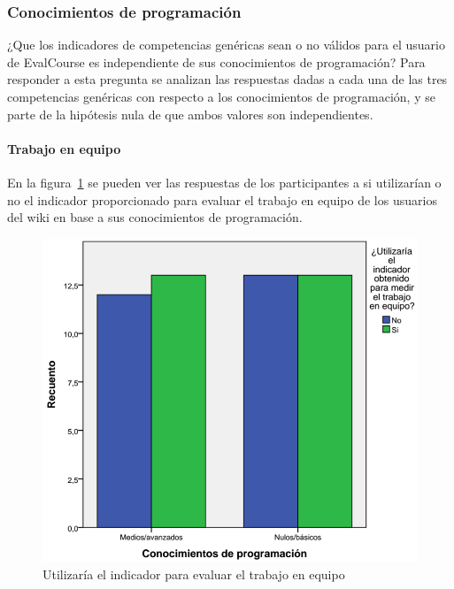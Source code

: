 \subsubsection{Conocimientos de programación}

¿Que los indicadores de competencias genéricas sean o no válidos para el usuario de EvalCourse es independiente de sus conocimientos de programación? Para responder a esta pregunta se analizan las respuestas dadas a cada una de las tres competencias genéricas con respecto a los conocimientos de programación, y se parte de la hipótesis nula de que ambos valores son independientes.

\paragraph*{Trabajo en equipo}

En la figura~\ref{fig:app:barras:programacion:equipo} se pueden ver las respuestas de los participantes a si utilizarían o no el indicador proporcionado para evaluar el trabajo en equipo de los usuarios del wiki en base a sus conocimientos de programación.

\begin{figure}
  \begin{center}
    \includegraphics[scale=0.3]{barras_programacion_equipo.png}
  \end{center}
  \caption{Utilizaría el indicador para evaluar el trabajo en equipo}
  \label{fig:app:barras:programacion:equipo}
\end{figure}

